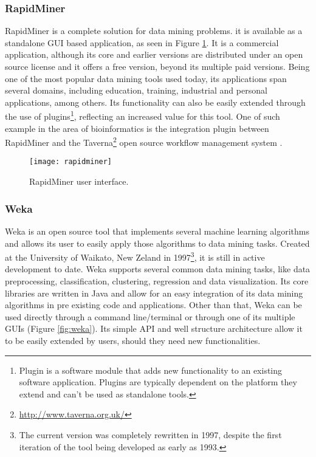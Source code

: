 \subsubsection*{RapidMiner}

RapidMiner \cite{rapidminer} is a complete solution for data mining problems. it
is available as a standalone GUI based application, as seen in Figure
\ref{fig:rapidminer}. It is a commercial application, although its core and
earlier versions are distributed under an open source license and it offers a
free version, beyond its multiple paid versions. Being one of the most popular
data mining tools used today, its applications span several domains, including
education, training, industrial and personal applications, among others. Its
functionality can also be easily extended through the use of
plugins\footnote{Plugin is a software module that adds new functionality to an
existing software application. Plugins are typically dependent on the platform
they extend and can't be used as standalone tools.}, reflecting an increased
value for this tool. One of such example in the area of bioinformatics is the
integration plugin between RapidMiner and the
Taverna\footnote{\url{http://www.taverna.org.uk/}} open source workflow
management system \cite{Jupp2011}.

\begin{figure}[!htb]
  \begin{center}
    \leavevmode
    \texttt{[image: rapidminer]}
    \caption[RapidMiner user interface]{RapidMiner user interface.}
    \label{fig:rapidminer}
  \end{center}
\end{figure}

\subsubsection*{Weka}

Weka \cite{Hall} is an open source tool that implements several machine learning
algorithms and allows its user to easily apply those algorithms to data mining
tasks. Created at the University of Waikato, New Zeland in 1997\footnote{The
current version was completely rewritten in 1997, despite the first iteration of
the tool being developed as early as 1993.}, it is still in active development
to date. Weka supports several common data mining tasks, like data
preprocessing, classification, clustering, regression and data visualization.
Its core libraries are written in Java and allow for an easy integration of its
data mining algorithms in pre existing code and applications. Other than that,
Weka can be used directly through a command line/terminal or through one of its
multiple GUIs (Figure \ref{fig:weka}). Its simple API and well structure
architecture allow it to be easily extended by users, should they need new
functionalities.

